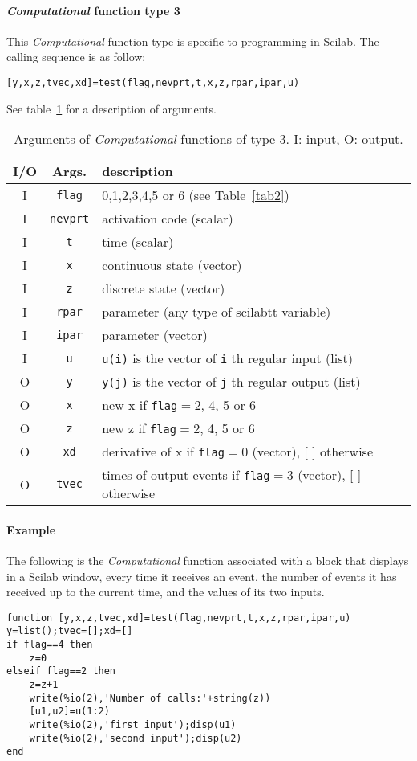 \documentclass{article}
\newcommand{\computational}{{\em Computational }}
\begin{document}
\paragraph{\computational function type 3}
This \computational function type is specific to programming in
Scilab. The calling sequence is as follow:
\begin{verbatim}
[y,x,z,tvec,xd]=test(flag,nevprt,t,x,z,rpar,ipar,u)
\end{verbatim}  
See table~\ref{tab30} for a description of arguments.
\begin{table}[ht]
\begin{center}
\begin{tabular}{|c|c|l|} \hline
I/O&Args.&description \\ \hline
I &  {\tt flag} & 0,1,2,3,4,5 or 6  (see Table~\ref{tab2}) \\
I &  {\tt nevprt} & activation code (scalar)\\
I &  {\tt t} & time (scalar)\\
I &  {\tt x} & continuous state (vector)\\
I &  {\tt z} & discrete state (vector)\\
I &  {\tt rpar}  &parameter (any type of scilabtt variable)\\
I &  {\tt ipar} & parameter (vector)\\
I &  {\tt u} & {\tt u(i)} is the vector of {\tt i} th regular input (list) \\
O &  {\tt y}& {\tt y(j)} is the vector of {\tt j} th regular output (list)\\
O &  {\tt x} & new x if {\tt flag}$=$2, 4, 5 or 6 \\
O &  {\tt z} & new z if {\tt flag}$=$2, 4, 5 or 6 \\
O &  {\tt xd} & derivative of x if {\tt flag}$=0$ (vector), [ ] otherwise\\
O &  {\tt tvec} & times of output events if {\tt flag}$=$3 (vector), [ ] otherwise \\ \hline
\end{tabular}
\caption{Arguments of \computational functions of type 3. I: input, O: output.}
\label{tab30}
\end{center}
\end{table}
 


\paragraph{Example}
The following is the \computational function associated with a block
that displays in a Scilab window, every time it receives an event, the
number of events it has received up to the current time, and the values
of its two inputs.
\begin{verbatim}
function [y,x,z,tvec,xd]=test(flag,nevprt,t,x,z,rpar,ipar,u)
y=list();tvec=[];xd=[]
if flag==4 then
    z=0
elseif flag==2 then
    z=z+1
    write(%io(2),'Number of calls:'+string(z))
    [u1,u2]=u(1:2)
    write(%io(2),'first input');disp(u1)
    write(%io(2),'second input');disp(u2)
end
\end{verbatim}
\end{document}
